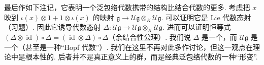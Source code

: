 \begin{numpara}[双代数结构]\label{np:ssl-2-2-5}
最后作如下注记，它表明一个泛包络代数携带的结构比结合代数的更多. 考虑把 $x$ 映到 $\iota(x) \otimes 1 + 1 \otimes \iota(x)$ 的映射 $\mathfrak g \longrightarrow \mathcal{U}\mathfrak g \otimes_{K} \mathcal{U}\mathfrak g$. 可以证明它是 Lie 代数态射（习题）. 因此它诱导代数态射 $\Delta : \mathcal{U}\mathfrak g \longrightarrow \mathcal{U}\mathfrak g \otimes_{K} \mathcal{U}\mathfrak g$. 进而可以证明恒等式 $(\Delta \otimes \operatorname{id}) \circ \Delta = (\operatorname{id} \otimes \Delta) \circ \Delta$（余结合性公理）. 我们说 $\Delta$ 是一个，而 $\mathcal{U}\mathfrak g$ 是一个（甚至是一种``Hopf 代数''）. 我们在这里不再对此多作讨论，但这一观点在理论中是根本性的. 后者并不是真正意义上的群，而是经典泛包络代数的一种``形变''.
\end{numpara}
